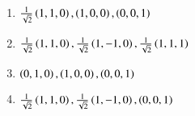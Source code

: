 \documentclass[journal]{IEEEtran}
\begin{document}
\begin{enumerate}
    \begin{enumerate}[label=(\Alph*)]
        \item $\frac{1}{\sqrt{2}}\left(1,1,0\right),\left(1,0,0\right),\left(0,0,1\right)$
        \item $\frac{1}{\sqrt{2}}\left(1,1,0\right),\frac{1}{\sqrt{2}}\left(1,-1,0\right),\frac{1}{\sqrt{2}}\left(1,1,1\right)$ 
        \item $\left(0,1,0\right),\left(1,0,0\right),\left(0,0,1\right)$
        \item $\frac{1}{\sqrt{2}}\left(1,1,0\right),\frac{1}{\sqrt{2}}\left(1,-1,0\right),\left(0,0,1\right)$ 
    \end{enumerate} 
\end{enumerate}
\end{document}
